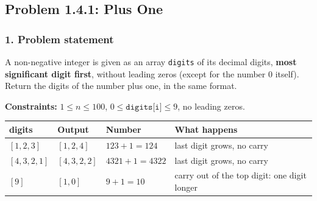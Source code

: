 \subsection{Problem 1.4.1: Plus One}


\subsubsection*{1. Problem statement}

A non-negative integer is given as an array \texttt{digits} of its decimal digits, \textbf{most significant digit first}, without leading zeros (except for the number 0 itself). Return the digits of the number plus one, in the same format.

\textbf{Constraints:} $1 \le n \le 100$, \; $0 \le \texttt{digits[i]} \le 9$, \; no leading zeros.

\begin{table}[H]
\centering\small
\begin{tabular}{@{}llll@{}}
\toprule
\textbf{digits} & \textbf{Output} & \textbf{Number} & \textbf{What happens} \\
\midrule
$[1,2,3]$ & $[1,2,4]$ & $123 + 1 = 124$ & last digit grows, no carry \\
$[4,3,2,1]$ & $[4,3,2,2]$ & $4321 + 1 = 4322$ & last digit grows, no carry \\
$[9]$ & $[1,0]$ & $9 + 1 = 10$ & carry out of the top digit: one digit longer \\
\bottomrule
\end{tabular}
\end{table}

